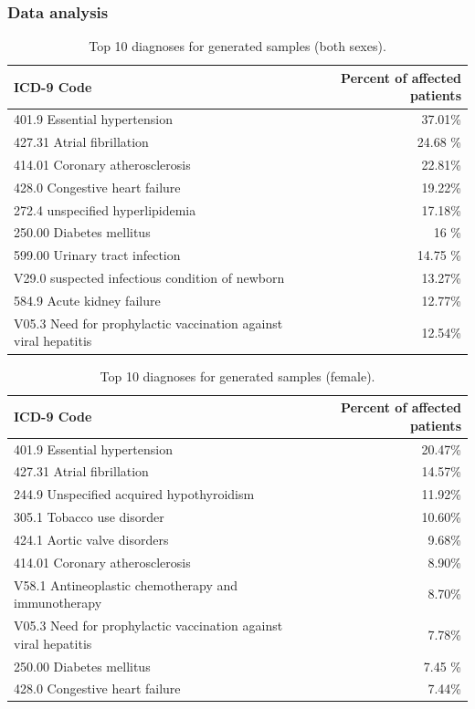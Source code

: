 \documentclass[11pt, a4paper]{book}
\begin{document}
\subsubsection{Data analysis}

\begin{table}
\begin{tabular}{l|r}
\textbf{ICD-9 Code} & \textbf{Percent of affected patients}\\
\hline
401.9  Essential hypertension & 37.01\%\\
427.31 Atrial fibrillation & 24.68 \%\\
414.01 Coronary atherosclerosis & 22.81\%\\
428.0 Congestive heart failure & 19.22\%\\
272.4 unspecified hyperlipidemia & 17.18\%\\
250.00 Diabetes mellitus & 16 \%\\
599.00 Urinary tract infection & 14.75 \%\\
V29.0 suspected infectious condition of newborn & 13.27\%\\
584.9 Acute kidney failure & 12.77\%\\
V05.3 Need for prophylactic vaccination against viral hepatitis & 12.54\%\\
\end{tabular}
\caption{\label{tab:top10-icd-mixed}Top 10 diagnoses for generated samples (both sexes).}
\end{table}

\begin{table}
\begin{tabular}{l|r}
\textbf{ICD-9 Code} & \textbf{Percent of affected patients}\\
\hline
401.9  Essential hypertension & 20.47\%\\
427.31 Atrial fibrillation & 14.57\%\\
244.9 Unspecified acquired hypothyroidism & 11.92\%\\
305.1 Tobacco use disorder & 10.60\%\\
424.1 Aortic valve disorders & 9.68\%\\
414.01 Coronary atherosclerosis & 8.90\%\\
V58.1 Antineoplastic chemotherapy and immunotherapy & 8.70\%\\
V05.3 Need for prophylactic vaccination against viral hepatitis & 7.78\%\\
250.00 Diabetes mellitus & 7.45 \%\\
428.0 Congestive heart failure & 7.44\%\\
\end{tabular}
\caption{\label{tab:top10-icd-mixed}Top 10 diagnoses for generated samples (female).}
\end{table}
\end{document}

